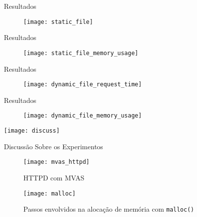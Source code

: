 \documentclass[xcolor={usenames,svgnames,dvipsnames},brazil,english,12pt,aspectratio=149]{beamer}
\begin{document}
\begin{frame}{Resultados}
  \begin{figure}[!h]
    \centering
    \texttt{[image: static\_file]}
  \end{figure}
\end{frame}

\begin{frame}{Resultados}
  \begin{figure}[!h]
    \centering
    \texttt{[image: static\_file\_memory\_usage]}
  \end{figure}
\end{frame}

\begin{frame}{Resultados}
  \begin{figure}[!h]
    \centering
    \texttt{[image: dynamic\_file\_request\_time]}
  \end{figure}
\end{frame}

\begin{frame}{Resultados}
  \begin{figure}[!h]
    \centering
    \texttt{[image: dynamic\_file\_memory\_usage]}
  \end{figure}
\end{frame}

\begin{frame}[plain]
  \centering
  \texttt{[image: discuss]}
\end{frame}

\begin{frame}{Discussão Sobre os Experimentos}
  \begin{figure}[!h]
    \centering
    \texttt{[image: mvas\_httpd]}
    \caption*{HTTPD com MVAS}
  \end{figure}
  \begin{figure}[!h]
    \centering
    \texttt{[image: malloc]}
    \caption*{Passos envolvidos na alocação de memória com \texttt{malloc()}}
  \end{figure}
\end{frame}

\end{document}
